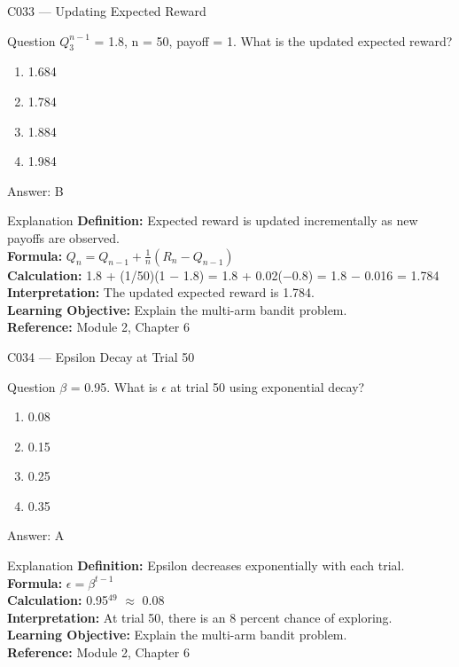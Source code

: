 \documentclass[aspectratio=169,8pt]{beamer}
\begin{document}
	\begin{frame}{C033 --- Updating Expected Reward}
		\begin{block}{Question}
			$Q_3^{n-1}$ = 1.8, n = 50, payoff = 1. What is the updated expected reward?
			\begin{enumerate}
				\item 1.684
				\item 1.784
				\item 1.884
				\item 1.984
			\end{enumerate}
		\end{block}
		\begin{exampleblock}{Answer: B}\end{exampleblock}
		\begin{block}{Explanation}
			\textbf{Definition:} Expected reward is updated incrementally as new payoffs are observed.\\
			\textbf{Formula:} $Q_n = Q_{n-1} + \frac{1}{n}(R_n - Q_{n-1})$\\
			\textbf{Calculation:} 1.8 + (1/50)(1 $-$ 1.8) = 1.8 + 0.02($-$0.8) = 1.8 $-$ 0.016 = 1.784\\
			\textbf{Interpretation:} The updated expected reward is 1.784.\\
			\textbf{Learning Objective:} Explain the multi-arm bandit problem.\\
			\textbf{Reference:} Module 2, Chapter 6
		\end{block}
	\end{frame}
	
	\begin{frame}{C034 --- Epsilon Decay at Trial 50}
		\begin{block}{Question}
			$\beta$ = 0.95. What is $\epsilon$ at trial 50 using exponential decay?
			\begin{enumerate}
				\item 0.08
				\item 0.15
				\item 0.25
				\item 0.35
			\end{enumerate}
		\end{block}
		\begin{exampleblock}{Answer: A}\end{exampleblock}
		\begin{block}{Explanation}
			\textbf{Definition:} Epsilon decreases exponentially with each trial.\\
			\textbf{Formula:} $\epsilon = \beta^{t-1}$\\
			\textbf{Calculation:} 0.95$^{49}$ $\approx$ 0.08\\
			\textbf{Interpretation:} At trial 50, there is an 8 percent chance of exploring.\\
			\textbf{Learning Objective:} Explain the multi-arm bandit problem.\\
			\textbf{Reference:} Module 2, Chapter 6
		\end{block}
	\end{frame}
	
\end{document}
